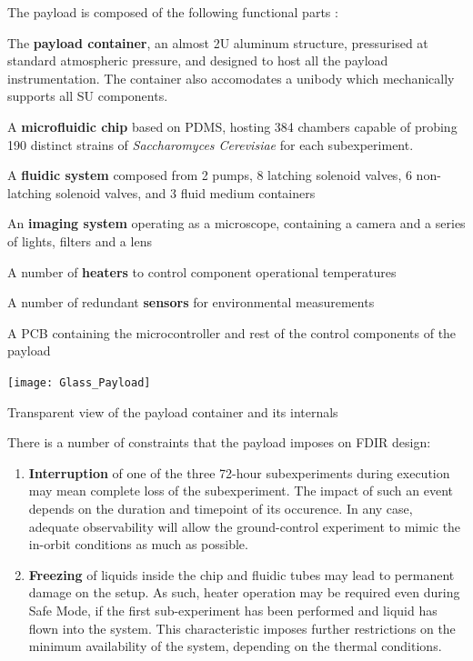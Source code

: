 \documentclass[a4paper,nobib]{tufte-book}
\begin{document}
The payload is composed of the following functional parts \autocite{DDJF_PL}:
\begin{compactitem}
	\item The \textbf{payload container}, an almost 2U aluminum structure, pressurised at standard atmospheric pressure, and designed to host all the payload instrumentation. The container also accomodates a unibody which mechanically supports all \ac{SU} components.
	\item A \textbf{microfluidic chip} based on \ac{PDMS}, hosting 384 chambers capable of probing 190 distinct strains of \emph{Saccharomyces Cerevisiae} for each subexperiment.
	\item A \textbf{fluidic system} composed from 2 pumps, 8 latching solenoid valves, 6 non-latching solenoid valves, and 3 fluid medium containers
	\item An \textbf{imaging system} operating as a microscope, containing a camera and a series of lights, filters and a lens
	\item A number of \textbf{heaters} to control component operational temperatures
	\item A number of redundant \textbf{sensors} for environmental measurements
	\item A \ac{PCB} containing the microcontroller and rest of the control components of the payload
\end{compactitem}

\begin{marginfigure}
	\centering
	\texttt{[image: Glass\_Payload]}
	\caption{Transparent view of the payload container and its internals}
	\label{fig:container}
\end{marginfigure}

\label{sec:su_fdir}
There is a number of constraints that the payload imposes on \ac{FDIR} design:
\begin{enumerate}
	\item \textbf{Interruption} of one of the three 72-hour subexperiments during execution may mean complete loss of the subexperiment. The impact of such an event depends on the duration and timepoint of its occurence. In any case, adequate observability will allow the ground-control experiment to mimic the in-orbit conditions as much as possible.
	\item \textbf{Freezing} of liquids inside the chip and fluidic tubes may lead to permanent damage on the setup. As such, heater operation may be required even during Safe Mode, if the first sub-experiment has been performed and liquid has flown into the system. This characteristic imposes further restrictions on the minimum availability of the system, depending on the thermal conditions.
\end{enumerate}
\end{document}
